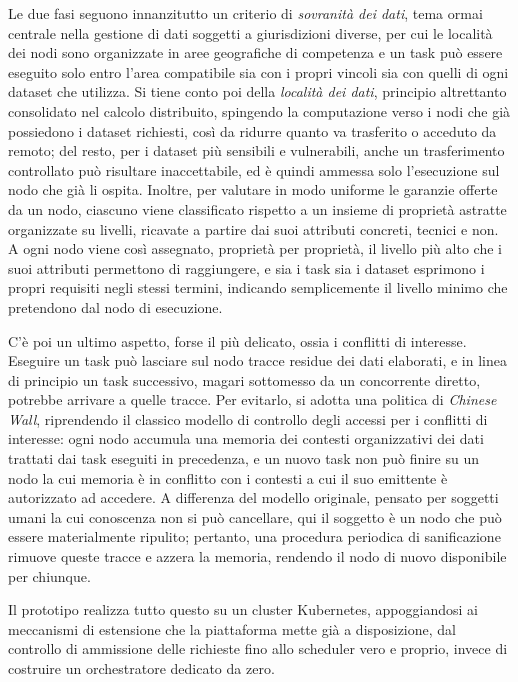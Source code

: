 Le due fasi seguono innanzitutto un criterio di \emph{sovranità dei dati}, tema ormai centrale nella gestione di dati soggetti a giurisdizioni diverse, per cui le località dei nodi sono organizzate in aree geografiche di competenza e un task può essere eseguito solo entro l'area compatibile sia con i propri vincoli sia con quelli di ogni dataset che utilizza. Si tiene conto poi della \emph{località dei dati}, principio altrettanto consolidato nel calcolo distribuito, spingendo la computazione verso i nodi che già possiedono i dataset richiesti, così da ridurre quanto va trasferito o acceduto da remoto; del resto, per i dataset più sensibili e vulnerabili, anche un trasferimento controllato può risultare inaccettabile, ed è quindi ammessa solo l'esecuzione sul nodo che già li ospita. Inoltre, per valutare in modo uniforme le garanzie offerte da un nodo, ciascuno viene classificato rispetto a un insieme di proprietà astratte organizzate su livelli, ricavate a partire dai suoi attributi concreti, tecnici e non. A ogni nodo viene così assegnato, proprietà per proprietà, il livello più alto che i suoi attributi permettono di raggiungere, e sia i task sia i dataset esprimono i propri requisiti negli stessi termini, indicando semplicemente il livello minimo che pretendono dal nodo di esecuzione.

C'è poi un ultimo aspetto, forse il più delicato, ossia i conflitti di interesse. Eseguire un task può lasciare sul nodo tracce residue dei dati elaborati, e in linea di principio un task successivo, magari sottomesso da un concorrente diretto, potrebbe arrivare a quelle tracce. Per evitarlo, si adotta una politica di \emph{Chinese Wall}, riprendendo il classico modello di controllo degli accessi per i conflitti di interesse: ogni nodo accumula una memoria dei contesti organizzativi dei dati trattati dai task eseguiti in precedenza, e un nuovo task non può finire su un nodo la cui memoria è in conflitto con i contesti a cui il suo emittente è autorizzato ad accedere. A differenza del modello originale, pensato per soggetti umani la cui conoscenza non si può cancellare, qui il soggetto è un nodo che può essere materialmente ripulito; pertanto, una procedura periodica di sanificazione rimuove queste tracce e azzera la memoria, rendendo il nodo di nuovo disponibile per chiunque.

Il prototipo realizza tutto questo su un cluster Kubernetes, appoggiandosi ai meccanismi di estensione che la piattaforma mette già a disposizione, dal controllo di ammissione delle richieste fino allo scheduler vero e proprio, invece di costruire un orchestratore dedicato da zero.

